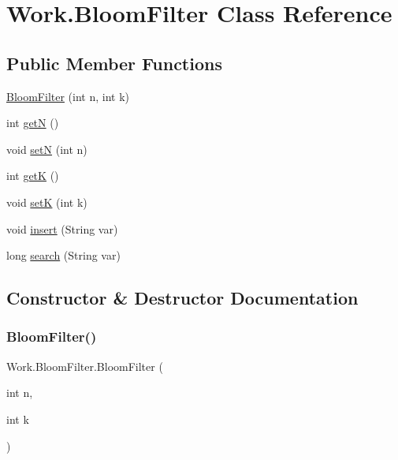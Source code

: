 \hypertarget{classWork_1_1BloomFilter}{}\section{Work.\+Bloom\+Filter Class Reference}
\label{classWork_1_1BloomFilter}
\subsection*{Public Member Functions}
\begin{DoxyCompactItemize}
\item 
\hyperlink{classWork_1_1BloomFilter_ac61266e8a185a3c45a6bd55f201501e0}{Bloom\+Filter} (int n, int k)
\item 
int \hyperlink{classWork_1_1BloomFilter_a51b12111700fe438437ea4a3e417a448}{getN} ()
\item 
void \hyperlink{classWork_1_1BloomFilter_ad89720e05fbbd6383c45c3a7838c8789}{setN} (int n)
\item 
int \hyperlink{classWork_1_1BloomFilter_ac84e30c9b46982f948bcc7b19a4551b0}{getK} ()
\item 
void \hyperlink{classWork_1_1BloomFilter_a34c584cddceb2b532bba959394a99ef5}{setK} (int k)
\item 
void \hyperlink{classWork_1_1BloomFilter_a43575a7e07ba726869e99467e123bc76}{insert} (String var)
\item 
long \hyperlink{classWork_1_1BloomFilter_a26d4c3ed24f8ecedb67d2ed34e81f5d4}{search} (String var)
\end{DoxyCompactItemize}


\subsection{Constructor \& Destructor Documentation}
\mbox{\label{classWork_1_1BloomFilter_ac61266e8a185a3c45a6bd55f201501e0}} 
\subsubsection{\texorpdfstring{Bloom\+Filter()}{BloomFilter()}}
{\footnotesize\ttfamily Work.\+Bloom\+Filter.\+Bloom\+Filter (\begin{DoxyParamCaption}\item[{int}]{n,  }\item[{int}]{k }\end{DoxyParamCaption})\hspace{0.3cm}{\ttfamily [inline]}}

